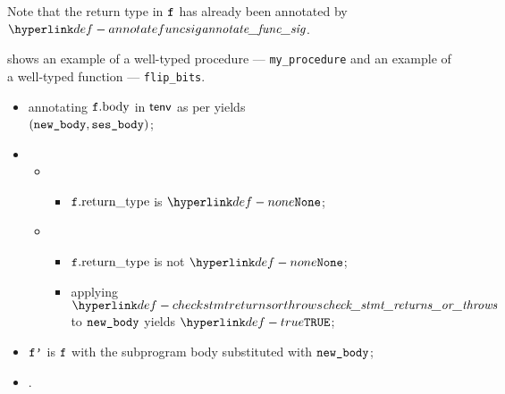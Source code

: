 Note that the return type in $\vf$ has already been annotated by $\annotatefuncsig$.

 shows an example of a well-typed procedure --- \verb|my_procedure|
and an example of a well-typed function --- \verb|flip_bits|.

\ProseParagraph
\AllApply
\begin{itemize}
  \item annotating $\vf.\funcbody$ in $\tenv$ as per  yields \\
        $(\newbody, \vsesbody)$\ProseOrTypeError;
  \item \OneApplies
  \begin{itemize}
    \item {}
    \begin{itemize}
      \item $\vf.\funcreturntype$ is $\None$;
    \end{itemize}

    \item {}
    \begin{itemize}
      \item $\vf.\funcreturntype$ is not $\None$;
      \item applying $\checkstmtreturnsorthrows$ to $\newbody$ yields $\True$\ProseOrTypeError;
    \end{itemize}
  \end{itemize}
  \item $\vfp$ is $\vf$ with the subprogram body substituted with $\newbody$;
  \item {}.
\end{itemize}

\FormallyParagraph
\begin{mathpar}
\end{mathpar}

